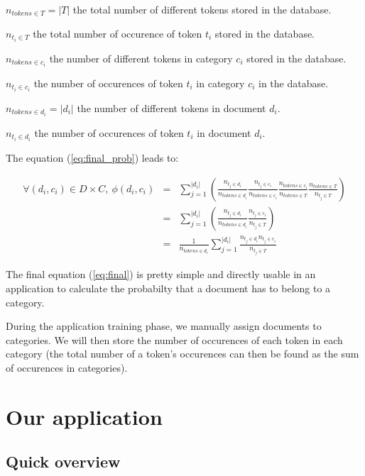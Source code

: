 \documentclass[a4paper,11pt]{article}
\begin{document}
$n_{tokens \in T} = |T|$ the total number of different tokens stored in the
database.

$n_{t_i \in T}$ the total number of occurence of token $t_i$ stored in the
database.

$n_{tokens \in c_i}$ the number of different tokens in category $c_i$ stored
in the database.

$n_{t_i \in c_i}$ the number of occurences of token $t_i$ in category $c_i$
in the database.

$n_{tokens \in d_i} = |d_i|$ the number of different tokens in document $d_i$.

$n_{t_i \in d_i}$ the number of occurences of token $t_i$ in document $d_i$.

The equation (\ref{eq:final_prob}) leads to:

\begin{eqnarray}\label{eq:final}
    \forall (d_i, c_i) \in D \times C,\ 
    \phi(d_i, c_i)
    &=& \sum_{j=1}^{|d_i|} (
        \frac{n_{t_j \in d_i}}{n_{tokens \in d_i}}
        \frac{n_{t_j \in c_i}}{n_{tokens \in c_i}}
        \frac{n_{tokens \in c_i}}{n_{tokens \in T}}
        \frac{n_{tokens \in T}}{n_{t_j \in T}}
    ) \nonumber \\
    &=& \sum_{j=1}^{|d_i|} (
        \frac{n_{t_j \in d_i}}{n_{tokens \in d_i}}
        \frac{n_{t_j \in c_i}}{n_{t_j \in T}}
    ) \nonumber \\
    &=& \frac{1}{n_{tokens \in d_i}}
        \sum_{j=1}^{|d_i|}
        \frac{n_{t_j \in d_i} n_{t_j \in c_i}}{n_{t_j \in T}}
\end{eqnarray}

The final equation (\ref{eq:final}) is pretty simple and directly usable in
an application to calculate the probabilty that a document has to belong to
a category.

During the application training phase, we manually assign documents to
categories. We will then store the number of occurences of each token in each
category (the total number of a token's occurences can then be found as the
sum of occurences in categories).

\section{Our application}

\subsection{Quick overview}
\end{document}

